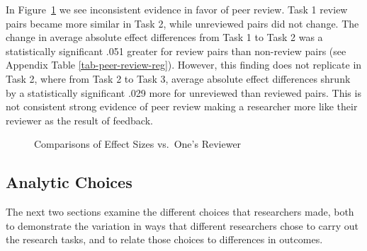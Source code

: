 \documentclass[
  letterpaper,
  DIV=11,
  numbers=noendperiod]{scrartcl}
\begin{document}
In Figure~\ref{fig-like-your-reviewer} we see inconsistent evidence in
favor of peer review. Task 1 review pairs became more similar in Task 2,
while unreviewed pairs did not change. The change in average absolute
effect differences from Task 1 to Task 2 was a statistically significant
.051 greater for review pairs than non-review pairs (see Appendix Table
\ref{tab-peer-review-reg}). However, this finding does not replicate in
Task 2, where from Task 2 to Task 3, average absolute effect differences
shrunk by a statistically significant .029 more for unreviewed than
reviewed pairs. This is not consistent strong evidence of peer review
making a researcher more like their reviewer as the result of feedback.

\begin{figure}


\caption{\label{fig-like-your-reviewer}Comparisons of Effect Sizes
vs.~One's Reviewer}

\end{figure}%

\subsection{Analytic Choices}\label{sec-analytic}

The next two sections examine the different choices that researchers
made, both to demonstrate the variation in ways that different
researchers chose to carry out the research tasks, and to relate those
choices to differences in outcomes.
\end{document}

